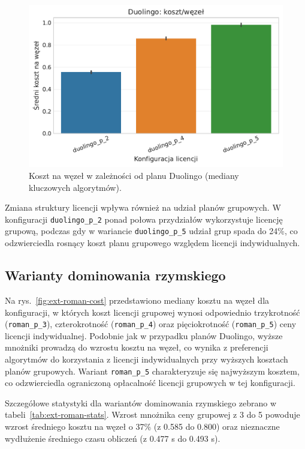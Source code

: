 \begin{figure}[H]
  \centering
  \includegraphics[width=0.6\linewidth]{assets/figures/extensions/static/duolingo_cost_per_node_comparison.pdf}
  \caption{Koszt na węzeł w zależności od planu Duolingo (mediany kluczowych algorytmów).}
  \label{fig:ext-duolingo-cost}
\end{figure}

Zmiana struktury licencji wpływa również na udział planów grupowych. W konfiguracji \texttt{duolingo\_p\_2} ponad połowa przydziałów wykorzystuje licencję grupową, podczas gdy w wariancie \texttt{duolingo\_p\_5} udział grup spada do 24\%, co odzwierciedla rosnący koszt planu grupowego względem licencji indywidualnych.

\subsection{Warianty dominowania rzymskiego}
Na rys.~\ref{fig:ext-roman-cost} przedstawiono mediany kosztu na węzeł dla konfiguracji, w których koszt licencji grupowej wynosi odpowiednio trzykrotność (\texttt{roman\_p\_3}), czterokrotność (\texttt{roman\_p\_4}) oraz pięciokrotność (\texttt{roman\_p\_5}) ceny licencji indywidualnej. Podobnie jak w przypadku planów Duolingo, wyższe mnożniki prowadzą do wzrostu kosztu na węzeł, co wynika z preferencji algorytmów do korzystania z licencji indywidualnych przy wyższych kosztach planów grupowych. Wariant \texttt{roman\_p\_5} charakteryzuje się najwyższym kosztem, co odzwierciedla ograniczoną opłacalność licencji grupowych w tej konfiguracji.

Szczegółowe statystyki dla wariantów dominowania rzymskiego zebrano w tabeli~\ref{tab:ext-roman-stats}. Wzrost mnożnika ceny grupowej z 3 do 5 powoduje wzrost średniego kosztu na węzeł o 37\% (z 0.585 do 0.800) oraz nieznaczne wydłużenie średniego czasu obliczeń (z 0.477 s do 0.493 s).

